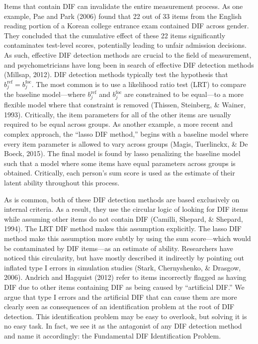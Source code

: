 \documentclass[
  english,
  man,floatsintext]{apa6}
\begin{document}
Items that contain DIF can invalidate the entire measurement process. As one example, Pae and Park (2006) found that 22 out of 33 items from the English reading portion of a Korean college entrance exam contained DIF across gender. They concluded that the cumulative effect of these 22 items significantly contaminates test-level scores, potentially leading to unfair admission decisions. As such, effective DIF detection methods are crucial to the field of measurement, and psychometricians have long been in search of effective DIF detection methods (Millsap, 2012). DIF detection methods typically test the hypothesis that \(b_j^{\text{ref}} = b_j^{\text{foc}}\). The most common is to use a likelihood ratio test (LRT) to compare the baseline model---where \(b_j^{\text{ref}}\) and \(b_j^{\text{foc}}\) are constrained to be equal---to a more flexible model where that constraint is removed (Thissen, Steinberg, \& Wainer, 1993). Critically, the item parameters for all of the other items are usually required to be equal across groups. As another example, a more recent and complex approach, the ``lasso DIF method,'' begins with a baseline model where every item parameter is allowed to vary across groups (Magis, Tuerlinckx, \& De Boeck, 2015). The final model is found by lasso penalizing the baseline model such that a model where some items have equal parameters across groups is obtained. Critically, each person's sum score is used as the estimate of their latent ability throughout this process.

As is common, both of these DIF detection methods are based exclusively on internal criteria. As a result, they use the circular logic of looking for DIF items while assuming other items do not contain DIF (Camilli, Shepard, \& Shepard, 1994). The LRT DIF method makes this assumption explicitly. The lasso DIF method make this assumption more subtly by using the sum score---which would be contaminated by DIF items---as an estimate of ability. Researchers have noticed this circularity, but have mostly described it indirectly by pointing out inflated type I errors in simulation studies (Stark, Chernyshenko, \& Drasgow, 2006). Andrich and Hagquist (2012) refer to items incorrectly flagged as having DIF due to other items containing DIF as being caused by ``artificial DIF.'' We argue that type I errors and the artificial DIF that can cause them are more clearly seen as consequences of an identification problem at the root of DIF detection. This identification problem may be easy to overlook, but solving it is no easy task. In fact, we see it as the antagonist of any DIF detection method and name it accordingly: the Fundamental DIF Identification Problem.
\end{document}
